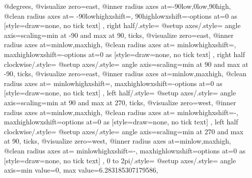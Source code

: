 {{{      @degrees,
      @visualize zero=east,
      @inner radius axes at={{-90}{low},{0}{low},{90}{high}},
      @clean radius axes at={%
        {-90}{low}{high}{xshift=}{},%
        {90}{high}{low}{xshift=-}{options at=0 as
          [{style={draw=none}, no tick text}]}
      }
    }
  },
  right half/.style={
    @setup axes/.style={
      angle axis={scaling=min at -90 and max at 90, ticks},
      @visualize zero=east,
      @inner radius axes at={{min}{low},{max}{high}},
      @clean radius axes at={%
        {min}{low}{high}{xshift=}{},%
        {max}{high}{low}{xshift=-}{options at=0 as
          [{style={draw=none}, no tick text}]}
      }
    }
  },
  right half clockwise/.style={
    @setup axes/.style={
      angle axis={scaling=min at 90 and max at -90, ticks},
      @visualize zero=east,
      @inner radius axes at={{min}{low},{max}{high}},
      @clean radius axes at={%
        {min}{low}{high}{xshift=}{},%
        {max}{high}{low}{xshift=-}{options at=0 as
          [{style={draw=none}, no tick text}]}
      }
    }
  },
  left half/.style={
    @setup axes/.style={
      angle axis={scaling=min at 90 and max at 270, ticks},
      @visualize zero=west,
      @inner radius axes at={{min}{low},{max}{high}},
      @clean radius axes at={%
        {min}{low}{high}{xshift=-}{},%
        {max}{high}{low}{xshift=}{options at=0 as
          [{style={draw=none}, no tick text}]}
      }
    }
  },
  left half clockwise/.style={
    @setup axes/.style={
      angle axis={scaling=min at 270 and max at 90, ticks},
      @visualize zero=west,
      @inner radius axes at={{min}{low},{max}{high}},
      @clean radius axes at={%
        {min}{low}{high}{xshift=-}{},%
        {max}{high}{low}{xshift=}{options at=0 as
          [{style={draw=none}, no tick text}]}
      }
    }
  },
  0 to 2pi/.style={
    @setup axes/.style={
      angle axis={min value=0, max value=6.283185307179586},
}}}

